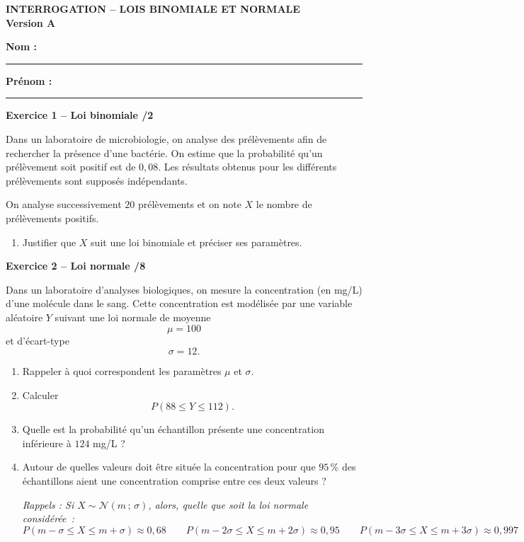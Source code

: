 \documentclass[10pt,a4paper]{article}
\newcommand{\version}[1]{
    \begin{center}
        \textbf{\large INTERROGATION -- LOIS BINOMIALE ET NORMALE}\\
        \textbf{Version #1}
    \end{center}

    \vspace{-0.1cm}

    \textbf{Nom :} \rule{5cm}{0.4pt}
    \hfill
    \textbf{Prénom :} \rule{4cm}{0.4pt}

    \vspace{0.2cm}
}
\begin{document}

\version{A}

\textbf{Exercice 1 -- Loi binomiale \hfill /2}

Dans un laboratoire de microbiologie, on analyse des prélèvements
afin de rechercher la présence d'une bactérie. On estime que la
probabilité qu'un prélèvement soit positif est de $0,08$.
Les résultats obtenus pour les différents prélèvements sont supposés
indépendants.

On analyse successivement $20$ prélèvements et on note $X$ le nombre
de prélèvements positifs.

\begin{enumerate}[label=\arabic*.]
    \item Justifier que $X$ suit une loi binomiale et préciser ses paramètres.
\end{enumerate}


\textbf{Exercice 2 -- Loi normale \hfill /8}

Dans un laboratoire d'analyses biologiques, on mesure la concentration
(en mg/L) d'une molécule dans le sang. Cette concentration est
modélisée par une variable aléatoire $Y$ suivant une loi normale de
moyenne
\[
\mu=100
\]
et d'écart-type
\[
\sigma=12.
\]

\begin{enumerate}[label=\arabic*.]
    \item Rappeler à quoi correspondent les paramètres $\mu$ et $\sigma$.

    \item Calculer
    \[
    P(88\leq Y\leq112).
    \]

    \item Quelle est la probabilité qu'un échantillon présente une
    concentration inférieure à $124$ mg/L ?

    \item Autour de quelles valeurs doit être située la concentration
    pour que $95\,\%$ des échantillons aient une concentration comprise
    entre ces deux valeurs ?

        \textit{Rappels : Si $X \sim \mathcal{N}(m\,;\,\sigma)$, alors, quelle que soit la loi normale considérée~:
$$P(m-\sigma \leqslant X \leqslant m+\sigma) \approx 0{,}68 \qquad P(m-2\sigma \leqslant X \leqslant m+2\sigma) \approx 0{,}95 \qquad P(m-3\sigma \leqslant X \leqslant m+3\sigma) \approx 0{,}997$$} 
\end{enumerate}
\end{document}
